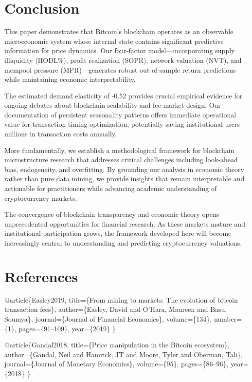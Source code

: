 \documentclass[
  12pt,
  letterpaper,
  DIV=11,
  numbers=noendperiod]{scrartcl}
\begin{document}
\section{Conclusion}\label{conclusion}

This paper demonstrates that Bitcoin's blockchain operates as an
observable microeconomic system whose internal state contains
significant predictive information for price dynamics. Our four-factor
model---incorporating supply illiquidity (HODL\%), profit realization
(SOPR), network valuation (NVT), and mempool pressure (MPR)---generates
robust out-of-sample return predictions while maintaining economic
interpretability.

The estimated demand elasticity of -0.52 provides crucial empirical
evidence for ongoing debates about blockchain scalability and fee market
design. Our documentation of persistent seasonality patterns offers
immediate operational value for transaction timing optimization,
potentially saving institutional users millions in transaction costs
annually.

More fundamentally, we establish a methodological framework for
blockchain microstructure research that addresses critical challenges
including look-ahead bias, endogeneity, and overfitting. By grounding
our analysis in economic theory rather than pure data mining, we provide
insights that remain interpretable and actionable for practitioners
while advancing academic understanding of cryptocurrency markets.

The convergence of blockchain transparency and economic theory opens
unprecedented opportunities for financial research. As these markets
mature and institutional participation grows, the framework developed
here will become increasingly central to understanding and predicting
cryptocurrency valuations.

\section{References}\label{references}

@article\{Easley2019, title=\{From mining to markets: The evolution of
bitcoin transaction fees\}, author=\{Easley, David and O'Hara, Maureen
and Basu, Soumya\}, journal=\{Journal of Financial Economics\},
volume=\{134\}, number=\{1\}, pages=\{91--109\}, year=\{2019\} \}

@article\{Gandal2018, title=\{Price manipulation in the Bitcoin
ecosystem\}, author=\{Gandal, Neil and Hamrick, JT and Moore, Tyler and
Oberman, Tali\}, journal=\{Journal of Monetary Economics\},
volume=\{95\}, pages=\{86--96\}, year=\{2018\} \}
\end{document}
